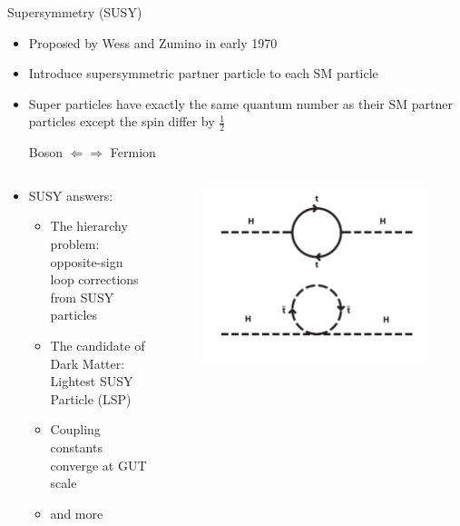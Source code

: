 \documentclass{beamer}
\begin{document}
{\begin{frame}{Supersymmetry (SUSY)}
    \begin{itemize}
        \item Proposed by Wess and Zumino in early 1970
        \item Introduce supersymmetric partner particle to each SM particle
        \item Super particles have exactly the same quantum number as their SM partner particles except the spin differ by $\frac{1}{2}$
        \begin{center}
            Boson $\Leftarrow \Rightarrow$ Fermion
        \end{center}
    \end{itemize}
    \begin{columns}
        \begin{column}{0.7\textwidth}
            \begin{itemize}
                \item SUSY answers:
            \begin{itemize}
                \item The hierarchy problem: opposite-sign loop corrections from SUSY particles
                \item The candidate of Dark Matter: Lightest SUSY Particle (LSP)
                \item Coupling constants converge at GUT scale
                \item and more
            \end{itemize}
        \end{itemize}
        \end{column}
        \begin{column}{0.3\textwidth}
            \begin{figure}
                \includegraphics[scale=0.09]{figures/one-loop-correction.png}\\

\end{figure}
\end{column}
\end{columns}
\end{frame}}
\end{document}
